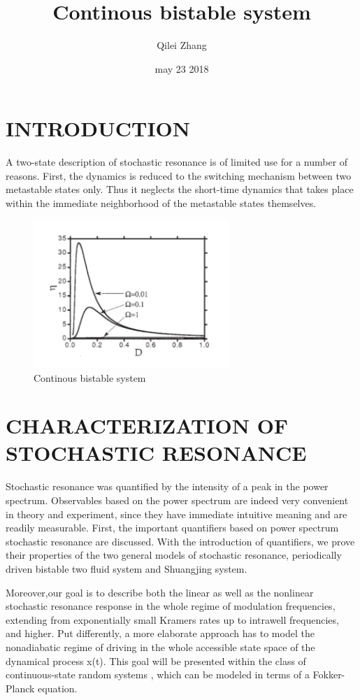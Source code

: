 \documentclass[10pt]{article}
\begin{document}
\title{Continous bistable system}
\author{Qilei Zhang}
\date{may 23 2018}
\maketitle
\par
\section{INTRODUCTION}
A two-state description of stochastic resonance is of limited use for a number of reasons. First, the dynamics is reduced to the switching mechanism between two metastable states only\cite{higbibtex}. Thus it neglects the short-time dynamics that takes place within the immediate neighborhood of the metastable states themselves.
\par
\begin{figure}[htbp]
\small
\centering
\includegraphics[width=20em]{000.png}
\caption{Continous  bistable  system}
\label{fig:lable}
\end{figure}
\section{CHARACTERIZATION OF STOCHASTIC RESONANCE}
Stochastic resonance was quantified by the intensity of a peak in the power spectrum. Observables based on the power spectrum are indeed very convenient in theory and experiment, since they have immediate intuitive meaning and are readily measurable. First, the important quantifiers based on power spectrum stochastic resonance are discussed. With the introduction of quantifiers\cite{higham1994bibtex}, we prove their properties of the two general models of stochastic resonance, periodically driven bistable two fluid system and Shuangjing system.
\par
Moreover,our goal is to describe both the linear as well as the nonlinear stochastic resonance response in the whole regime of modulation frequencies, extending from exponentially small Kramers rates up to intrawell frequencies, and higher. Put differently, a more elaborate approach has to model the nonadiabatic regime of driving in the whole accessible state space of the dynamical process x(t). This goal will be presented within the class of continuous-state random systems , which can be modeled in terms of a Fokker-Planck equation.
\end{document}
